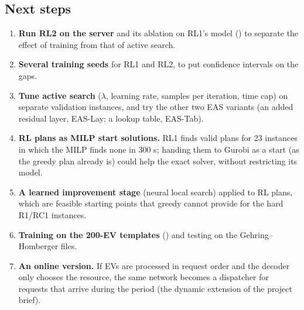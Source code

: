 \subsection{Next steps}

\begin{enumerate}
  \item \textbf{Run RL2 on the server} and its ablation on RL1's model () to separate the effect of training from that of active search.
  \item \textbf{Several training seeds} for RL1 and RL2, to put confidence intervals on the gaps.
  \item \textbf{Tune active search} ($\lambda$, learning rate, samples per iteration, time cap) on separate validation instances, and try the other two EAS variants (an added residual layer, EAS-Lay; a lookup table, EAS-Tab).
  \item \textbf{RL plans as MILP start solutions.} RL1 finds valid plans for 23 instances in which the MILP finds none in 300 s; handing them to Gurobi as a start (as the greedy plan already is) could help the exact solver, without restricting its model.
  \item \textbf{A learned improvement stage} (neural local search) applied to RL plans, which are feasible starting points that greedy cannot provide for the hard R1/RC1 instances.
  \item \textbf{Training on the 200-EV templates} () and testing on the Gehring--Homberger files.
  \item \textbf{An online version.} If EVs are processed in request order and the decoder only chooses the resource, the same network becomes a dispatcher for requests that arrive during the period (the dynamic extension of the project brief).
\end{enumerate}
